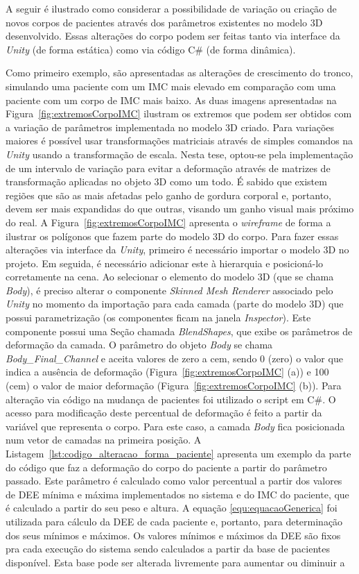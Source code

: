 A seguir é ilustrado como considerar a possibilidade de variação ou criação de novos corpos de pacientes através dos parâmetros existentes no modelo 3D desenvolvido. Essas alterações do corpo podem ser feitas tanto via interface da \textit{Unity} (de forma estática) como via código C\# (de forma dinâmica). 

Como primeiro exemplo, são apresentadas as alterações de crescimento do tronco, simulando uma paciente com um \acrshort{IMC} mais elevado em comparação com uma paciente com um corpo de \acrshort{IMC} mais baixo. As duas imagens apresentadas na Figura~\ref{fig:extremosCorpoIMC} ilustram os extremos que podem ser obtidos com a variação de parâmetros implementada no modelo 3D criado. Para variações maiores é possível usar transformações matriciais através de simples comandos na \textit{Unity} usando a transformação de escala. Nesta tese, optou-se pela implementação de um intervalo de variação para evitar a deformação através de matrizes de transformação aplicadas no objeto 3D como um todo. É sabido que existem regiões que são as mais afetadas pelo ganho de gordura corporal e, portanto, devem ser mais expandidas do que outras, visando um ganho visual mais próximo do real. A Figura~\ref{fig:extremosCorpoIMC} apresenta o \textit{wireframe} de forma a ilustrar os polígonos que fazem parte do modelo 3D do corpo. Para fazer essas alterações via interface da \textit{Unity}, primeiro é necessário importar o modelo 3D no projeto. Em seguida, é necessário adicionar este à hierarquia e posicioná-lo corretamente na cena. Ao selecionar o elemento do modelo 3D (que se chama \textit{Body}), é preciso alterar o componente \textit{Skinned Mesh Renderer} associado pelo \textit{Unity} no momento da importação para cada camada (parte do modelo 3D) que possui parametrização (os componentes ficam na janela \textit{Inspector}). Este componente possui uma Seção chamada \textit{BlendShapes}, que exibe os parâmetros de deformação da camada. O parâmetro do objeto \textit{Body} se chama \textit{Body\_Final\_Channel} e aceita valores de zero a cem, sendo 0 (zero) o valor que indica a ausência de deformação (Figura~\ref{fig:extremosCorpoIMC} (a)) e 100 (cem) o valor de maior deformação (Figura~\ref{fig:extremosCorpoIMC} (b)). Para alteração via código na mudança de pacientes foi utilizado o script em C\#. O acesso para modificação deste percentual de deformação é feito a partir da variável que representa o corpo. Para este caso, a camada \textit{Body} fica posicionada num vetor de camadas na primeira posição. A Listagem~\ref{lst:codigo_alteracao_forma_paciente} apresenta um exemplo da parte do código que faz a deformação do corpo do paciente a partir do parâmetro passado. Este parâmetro é calculado como valor percentual a partir dos valores de \acrshort{DEE} mínima e máxima implementados no sistema e do \acrshort{IMC} do paciente, que é calculado a partir do seu peso e altura. A equação \ref{equ:equacaoGenerica} foi utilizada para cálculo da \acrshort{DEE} de cada paciente e, portanto, para determinação dos seus mínimos e máximos. Os valores mínimos e máximos da \acrshort{DEE} são fixos pra cada execução do sistema sendo calculados a partir da base de pacientes disponível. Esta base pode ser alterada livremente para aumentar ou diminuir a 